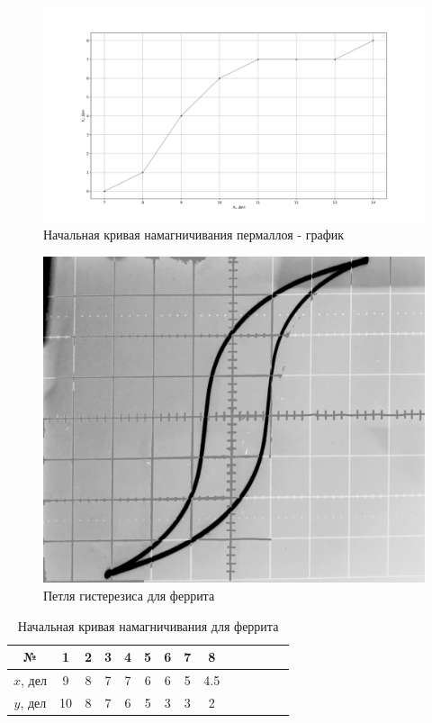 \documentclass[a4paper]{article}
\begin{document}
\begin{enumerate}
		      \begin{figure}[H]
			      \includegraphics[scale=0.5]{graph1.png}
			      \caption{Начальная кривая намагничивания пермаллоя - график}
		      \end{figure}

			  \begin{figure}[H]
				  \includegraphics[scale=0.22]{3.png}
				  \caption{Петля гистерезиса для феррита}
			  \end{figure}

		      \begin{table}[H]
			      \caption{Начальная кривая намагничивания для феррита}
			      \begin{center}
				      \begin{tabular}{|c|c|c|c|c|c|c|c|c|c|c|c|c|c|}
					      \hline
					      №          & 1   & 2   & 3   & 4   & 5   & 6   & 7   & 8 \\ \hline
					      $ x $, дел & 9 & 8 & 7 & 7 & 6 & 6 & 5 & 4.5 \\
					      $ y $, дел & 10 & 8 & 7 & 6 & 5 & 3 & 3 & 2 \\
					      \hline
				      \end{tabular}
			      \end{center}
		      \end{table}


\end{enumerate}
\end{document}
